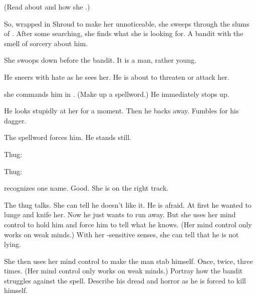 (Read about \Criseis and how she .)





\begin{comment}
  \section{Questions a thug}
\end{comment}
So, wrapped in Shroud to make her unnoticeable, she sweeps through the slums of \Malcur. 
After some searching, she finds what she is looking for. 
A bandit with the smell of \rethyactic sorcery about him.

She swoops down before the bandit. 
It is a \human man, rather young. 

He sneers with hate as he sees her. 
He is about to threaten or attack her. 

 she commands him in \TrueDraconic. 
(Make up a spellword.)
He immediately stops up. 


He looks stupidly at her for a moment. 
Then he backs away.
Fumbles for his dagger. 

The spellword forces him. 
He stands still. 

Thug: 


Thug: 

\Criseis recognizes one name. 
Good. 
She is on the right track. 

The thug talks. 
She can tell he doesn't like it. 
He is afraid. 
At first he wanted to lunge and knife her.
Now he just wants to run away. 
But she uses her mind control to hold him and force him to tell what he knows.
(Her mind control only works on weak minds.)
With her \uber-sensitive senses, she can tell that he is not lying.  


She then uses her mind control to make the man stab himself. 
Once, twice, three times. 
(Her mind control only works on weak minds.)
Portray how the bandit struggles against the spell.
Describe his dread and horror as he is forced to kill himself.

